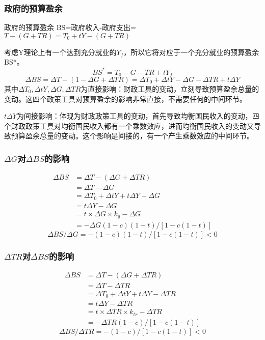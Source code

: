 \documentclass{article}
\begin{document}
\subsubsection{政府的预算盈余}
政府的预算盈余 BS=政府收入-政府支出=$ T-(G+TR)=T_0+tY-(G+TR
) $

考虑Y理论上有一个达到充分就业的$ Y_f $，所以它将对应于一个充分就业的预算盈余BS*。
\[
BS^*=T_0-G-TR+tY_f
\]
\[
\Delta BS=\Delta T-(1-\Delta G+\Delta TR)=\Delta T_0+\Delta tY-\Delta G-\Delta TR+t\Delta Y
\]
其中$ \Delta T_0,\Delta tY,\Delta G,\Delta TR $为直接影响：财政工具的变动，立刻导致预算盈余总量的变动。这四个政策工具对预算盈余的影响非常直接，不需要任何的中间环节。

$ t\Delta Y $为间接影响：体现为财政政策工具的变动，首先导致均衡国民收入的变动，四个财政政策工具对均衡国民收入都有一个乘数效应，进而均衡国民收入的变动又导致预算盈余总量的变动。这个影响是间接的，有一个产生乘数效应的中间环节。

\subsubsection{$ \Delta G $对$ \Delta BS $的影响}
\begin{equation*}
	\begin{split}
	\Delta BS&=\Delta T-(\Delta G+\Delta TR)\\
	&=\Delta T-\Delta G\\
	&=\Delta T_0+\Delta tY+t\Delta Y-\Delta G\\
	&=t\Delta Y-\Delta G\\
	&=t\times\Delta G\times k_g-\Delta G\\
	&=-\Delta G(1-c)(1-t)/[1-c(1-t)]
	\end{split}
\end{equation*}
\[
\Delta BS/\Delta G=-(1-c)(1-t)/[1-c(1-t)]<0
\]
\subsubsection{$ \Delta TR $对$ \Delta BS $的影响}
\begin{equation*}
\begin{split}
\Delta BS&=\Delta T-(\Delta G+\Delta TR)\\
&=\Delta T-\Delta TR\\
&=\Delta T_0+\Delta tY+t\Delta Y-\Delta TR\\
&=t\Delta Y-\Delta TR\\
&=t\times\Delta TR\times k_{tr}-\Delta TR\\
&=-\Delta TR(1-c)/[1-c(1-t)]
\end{split}
\end{equation*}
\[
\Delta BS/\Delta TR=-(1-c)/[1-c(1-t)]<0
\]
\end{document}
